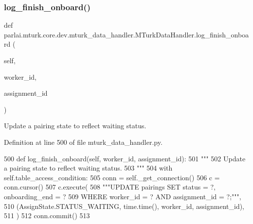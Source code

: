 \subsubsection{\texorpdfstring{log\+\_\+finish\+\_\+onboard()}{log\_finish\_onboard()}}
{\footnotesize\ttfamily def parlai.\+mturk.\+core.\+dev.\+mturk\+\_\+data\+\_\+handler.\+M\+Turk\+Data\+Handler.\+log\+\_\+finish\+\_\+onboard (\begin{DoxyParamCaption}\item[{}]{self,  }\item[{}]{worker\+\_\+id,  }\item[{}]{assignment\+\_\+id }\end{DoxyParamCaption})}

\begin{DoxyVerb}Update a pairing state to reflect waiting status.
\end{DoxyVerb}
 

Definition at line 500 of file mturk\+\_\+data\+\_\+handler.\+py.


\begin{DoxyCode}
500     \textcolor{keyword}{def }log\_finish\_onboard(self, worker\_id, assignment\_id):
501         \textcolor{stringliteral}{"""}
502 \textcolor{stringliteral}{        Update a pairing state to reflect waiting status.}
503 \textcolor{stringliteral}{        """}
504         with self.table\_access\_condition:
505             conn = self.\_get\_connection()
506             c = conn.cursor()
507             c.execute(
508                 \textcolor{stringliteral}{"""UPDATE pairings SET status = ?, onboarding\_end = ?}
509 \textcolor{stringliteral}{                         WHERE worker\_id = ? AND assignment\_id = ?;"""},
510                 (AssignState.STATUS\_WAITING, time.time(), worker\_id, assignment\_id),
511             )
512             conn.commit()
513 
\end{DoxyCode}
\mbox{\label{classparlai_1_1mturk_1_1core_1_1dev_1_1mturk__data__handler_1_1MTurkDataHandler_a97043bdbc4faa87164cd1e9d71559327}} 
